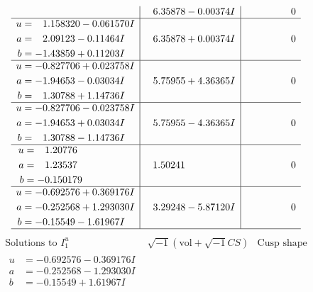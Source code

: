 \documentclass[1p]{elsarticle_modified}
\theoremstyle{definition}
\newcommand{\I}{\sqrt{-1}}
\begin{document}
$$\begin{array}{c|c|c}
 & \phantom{-}6.35878 - 0.00374 I & \phantom{-0.000000 } 0 \\ \hline\begin{aligned}
u &= \phantom{-}1.158320 - 0.061570 I \\
a &= \phantom{-}2.09123 - 0.11464 I \\
b &= -1.43859 + 0.11203 I\end{aligned}
 & \phantom{-}6.35878 + 0.00374 I & \phantom{-0.000000 } 0 \\ \hline\begin{aligned}
u &= -0.827706 + 0.023758 I \\
a &= -1.94653 - 0.03034 I \\
b &= \phantom{-}1.30788 + 1.14736 I\end{aligned}
 & \phantom{-}5.75955 + 4.36365 I & \phantom{-0.000000 } 0 \\ \hline\begin{aligned}
u &= -0.827706 - 0.023758 I \\
a &= -1.94653 + 0.03034 I \\
b &= \phantom{-}1.30788 - 1.14736 I\end{aligned}
 & \phantom{-}5.75955 - 4.36365 I & \phantom{-0.000000 } 0 \\ \hline\begin{aligned}
u &= \phantom{-}1.20776\phantom{ +0.000000I} \\
a &= \phantom{-}1.23537\phantom{ +0.000000I} \\
b &= -0.150179\phantom{ +0.000000I}\end{aligned}
 & \phantom{-}1.50241\phantom{ +0.000000I} & \phantom{-0.000000 } 0 \\ \hline\begin{aligned}
u &= -0.692576 + 0.369176 I \\
a &= -0.252568 + 1.293030 I \\
b &= -0.15549 - 1.61967 I\end{aligned}
 & \phantom{-}3.29248 - 5.87120 I & \phantom{-0.000000 } 0\\
 \hline 
 \end{array}$$\newpage$$\begin{array}{c|c|c}  
\text{Solutions to }I^u_{1}& \I (\text{vol} + \sqrt{-1}CS) & \text{Cusp shape}\\
 \hline 
\begin{aligned}
u &= -0.692576 - 0.369176 I \\
a &= -0.252568 - 1.293030 I \\
b &= -0.15549 + 1.61967 I\end{aligned}

\end{array}$$
\end{document}
